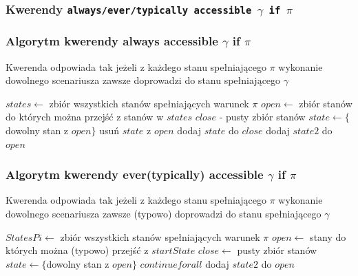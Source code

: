 \documentclass{article}
\begin{document}
\subsubsection{Kwerendy \texttt{always/ever/typically accessible $\gamma$ if $\pi$} }
\subsubsection{Algorytm kwerendy always accessible $\gamma$ if $\pi$}

Kwerenda odpowiada tak jeżeli z każdego stanu spełniającego $\pi$ wykonanie dowolnego scenariusza zawsze doprowadzi do stanu spełniającego $\gamma$

\begin{algorithm}[H]
\begin{algorithmic}
\State $states \gets $ zbiór wszystkich stanów spełniających warunek $\pi$ 
\State $open \gets $ zbiór stanów do których można przejść z stanów w $states$
\State $close$ - pusty zbiór stanów
    \State $state \gets \{$dowolny stan z $open\}$
    \State usuń $state$ z $open$
	\State dodaj $state$ do $close$
		    \State dodaj $state2$ do $open$
		\EndIf
	\EndFor
\EndWhile
	    \State {}
	\EndIf
\State {}
\end{algorithmic}
\end{algorithm}
\subsubsection{Algorytm kwerendy ever(typically) accessible $\gamma$ if $\pi$}

Kwerenda odpowiada tak jeżeli z każdego stanu spełniającego $\pi$ wykonanie dowolnego scenariusza zawsze (typowo) doprowadzi do stanu spełniającego $\gamma$

\begin{algorithm}[H]
\begin{algorithmic}
\State $StatesPi \gets $ zbiór wszystkich stanów spełniających warunek $\pi$ 
    \State $open \gets$ stany do których można (typowo) przejść z $startState$
    \State $close \gets$ pusty zbiór stanów
        \State $state \gets \{$dowolny stan z $open\}$
            \State $continue for all$
        \EndIf
                \State dodaj $state2$ do $open$
            \EndIf
        \EndFor
    \EndWhile
    \State {}
\EndFor
\State {}
\end{algorithmic}
\end{algorithm}
\end{document}
